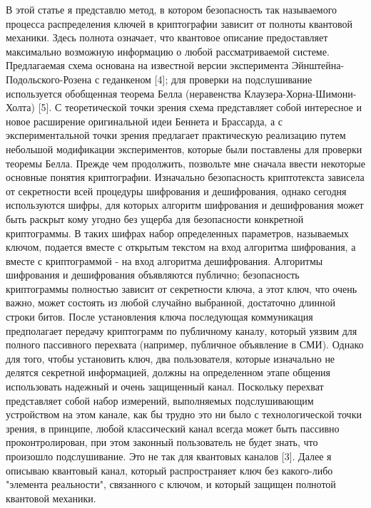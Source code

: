 В этой статье я представлю метод, в котором безопасность так называемого процесса распределения ключей в криптографии зависит от полноты квантовой механики. Здесь полнота означает, что квантовое описание предоставляет максимально возможную информацию о любой рассматриваемой системе. Предлагаемая схема основана на известной версии эксперимента Эйнштейна-Подольского-Розена с геданкеном [4]; для проверки на подслушивание используется обобщенная теорема Белла (неравенства Клаузера-Хорна-Шимони-Холта) [5]. С теоретической точки зрения схема представляет собой интересное и новое расширение оригинальной идеи Беннета и Брассарда, а с экспериментальной точки зрения предлагает практическую реализацию путем небольшой модификации экспериментов, которые были поставлены для проверки теоремы Белла. Прежде чем продолжить, позвольте мне сначала ввести некоторые основные понятия криптографии.
Изначально безопасность криптотекста зависела от секретности всей процедуры шифрования и дешифрования, однако сегодня используются шифры, для которых алгоритм шифрования и дешифрования может быть раскрыт кому угодно без ущерба для безопасности конкретной криптограммы. В таких шифрах набор определенных параметров, называемых ключом, подается вместе с открытым текстом на вход алгоритма шифрования, а вместе с криптограммой - на вход алгоритма дешифрования. Алгоритмы шифрования и дешифрования объявляются публично; безопасность криптограммы полностью зависит от секретности ключа, а этот ключ, что очень важно, может состоять из любой случайно выбранной, достаточно длинной строки битов. После установления ключа последующая коммуникация предполагает передачу криптограмм по публичному каналу, который уязвим для полного пассивного перехвата (например, публичное объявление в СМИ). Однако для того, чтобы установить ключ, два пользователя, которые изначально не делятся секретной информацией, должны на определенном этапе общения использовать надежный и очень защищенный канал. Поскольку перехват представляет собой набор измерений, выполняемых подслушивающим устройством на этом канале, как бы трудно это ни было с технологической точки зрения, в принципе, любой классический канал всегда может быть пассивно проконтролирован, при этом законный пользователь не будет знать, что произошло подслушивание. Это не так для квантовых каналов [3]. Далее я описываю квантовый канал, который распространяет ключ без какого-либо "элемента реальности", связанного с ключом, и который защищен полнотой квантовой механики.

